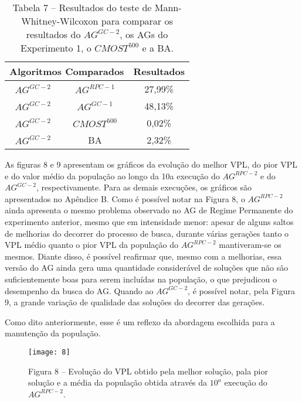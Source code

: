 \begin{table}[htb]
\centering
\caption{Tabela 7 – Resultados do teste de Mann-Whitney-Wilcoxon para comparar os resultados do $AG^{GC-2}$, os AGs do Experimento 1, o $CMOST^500$ e a BA.}

\begin{tabular}{|c|c|c|}
\hline
\multicolumn{2}{|c|}{Algoritmos Comparados} & Resultados \\ \hline
$AG^{GC-2}$ & $AG^{RPC-1}$ & 27,99\% \\ \hline
$AG^{GC-2}$ & $AG^{GC-1}$ & 48,13\% \\ \hline
$AG^{GC-2}$ & $CMOST^500$ & 0,02\% \\ \hline
$AG^{GC-2}$ & BA & 2,32\% \\ \hline

\end{tabular}
\end{table}

As figuras 8 e 9 apresentam os gráficos da evolução do melhor VPL, do pior VPL e do valor médio da população ao longo da 10a execução do $AG^{RPC-2}$ e do $AG^{GC-2}$, respectivamente. Para as demais execuções, os gráficos são apresentados no Apêndice B.  Como é possível notar na Figura 8, o $AG^{RPC-2}$ ainda apresenta o mesmo problema observado no AG de Regime Permanente do experimento anterior, mesmo que em intensidade menor: apesar de alguns saltos de melhorias do decorrer do processo de busca, durante várias gerações tanto o VPL médio quanto o pior VPL da população do $AG^{RPC-2}$ mantiveram-se os mesmos. Diante disso, é possível reafirmar que, mesmo com a melhorias, essa versão do AG ainda gera uma quantidade considerável de soluções que não são suficientemente boas para serem incluídas na população, o que prejudicou o desempenho da busca do AG. Quando ao $AG^{GC-2}$, é possível notar, pela Figura 9, a grande variação de qualidade das soluções do decorrer das gerações. 

Como dito anteriormente, esse é um reflexo da abordagem escolhida para a manutenção da população.

\begin{figure}[H]

\centering

\texttt{[image: 8]}


\caption{Figura 8 – Evolução do VPL obtido pela melhor solução, pala pior solução e a média da população obtida através da $10^a$ execução do $AG^{RPC-2}$.}

\end{figure}

